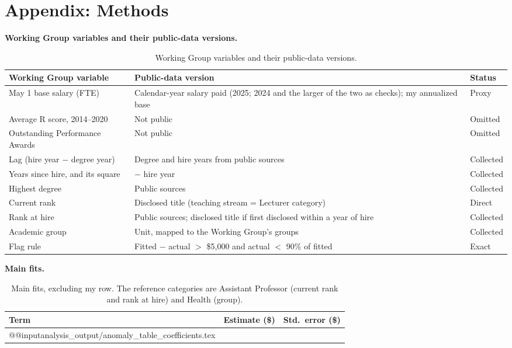 \documentclass{article}
\begin{document}
\newpage
\appendix
\section*{Appendix: Methods}

\textbf{Working Group variables and their public-data versions.}

\begin{table}[H]
\centering
\small
\begin{tabularx}{\textwidth}{>{\raggedright\arraybackslash}p{4.1cm}>{\raggedright\arraybackslash}X>{\raggedright\arraybackslash}p{1.6cm}}
\toprule
Working Group variable & Public-data version & Status \\
\midrule
May 1 base salary (FTE) & Calendar-year salary paid (2025; 2024 and the larger of the two as checks); my annualized base & Proxy \\
Average R score, 2014--2020 & Not public & Omitted \\
Outstanding Performance Awards & Not public & Omitted \\
Lag (hire year $-$ degree year) & Degree and hire years from public sources & Collected \\
Years since hire, and its square & 2025 $-$ hire year & Collected \\
Highest degree & Public sources & Collected \\
Current rank & Disclosed title (teaching stream = Lecturer category) & Direct \\
Rank at hire & Public sources; disclosed title if first disclosed within a year of hire & Collected \\
Academic group & Unit, mapped to the Working Group's groups & Collected \\
Flag rule & Fitted $-$ actual $>$ \$5{,}000 and actual $<$ 90\% of fitted & Exact \\
\bottomrule
\end{tabularx}
\caption{Working Group variables and their public-data versions.}
\label{tab:vars}
\end{table}

\textbf{Main fits.}

\begin{table}[H]
\centering
\footnotesize
\begin{tabular}{lrr}
\toprule
Term & Estimate (\$) & Std.\ error (\$) \\
\midrule
\csname @@input\endcsname analysis_output/anomaly_table_coefficients.tex 
\bottomrule
\end{tabular}
\caption{Main fits, excluding my row. The reference categories are Assistant Professor (current rank and rank at hire) and Health (group).}
\label{tab:coef}
\end{table}
\end{document}
